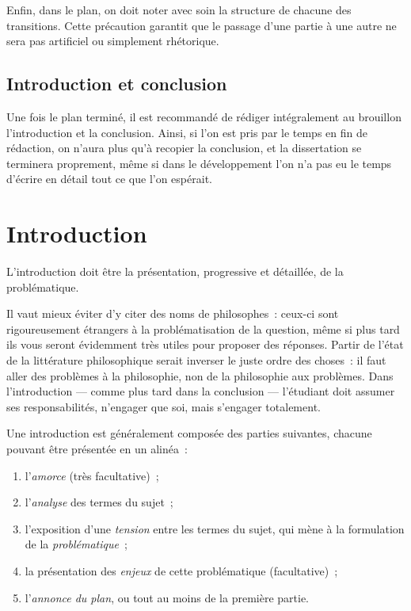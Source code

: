 \documentclass[a4paper,11pt]{article}
\begin{document}
\par

Enfin, dans le plan, on doit noter avec soin la structure de chacune des
transitions. Cette précaution garantit que le passage d'une partie à une
autre ne sera pas artificiel ou simplement rhétorique.

\par

\subsection{Introduction et conclusion}

Une fois le plan terminé, il est recommandé de rédiger intégralement au
brouillon l'introduction et la conclusion. Ainsi, si l'on est pris par
le temps en fin de rédaction, on n'aura plus qu'à recopier la
conclusion, et la dissertation se terminera proprement, même si dans le
développement l'on n'a pas eu le temps d'écrire en détail tout ce que
l'on espérait.




\section{Introduction}

L'introduction doit être la présentation, progressive et détaillée, de
la problématique.

\par

Il vaut mieux éviter d'y citer des noms de philosophes~: ceux-ci sont
rigoureusement étrangers à la problématisation de la question, même si
plus tard ils vous seront évidemment très utiles pour proposer des
réponses. Partir de l'état de la littérature philosophique serait
inverser le juste ordre des choses~: il faut aller des problèmes à la
philosophie, non de la philosophie aux problèmes. Dans l'introduction
--- comme plus tard dans la conclusion --- l'étudiant doit assumer ses
responsabilités, n'engager que soi, mais s'engager totalement.

\par

Une introduction est généralement composée des parties suivantes,
chacune pouvant être présentée en un alinéa~:
\begin{enumerate}
\item l'\emph{amorce} (très facultative)~;
\item l'\emph{analyse} des termes du sujet~;
\item l'exposition d'une \emph{tension} entre les termes du sujet, qui
  mène à la formulation de la \emph{problématique}~;
\item la présentation des \emph{enjeux} de cette problématique
  (facultative)~;
\item l'\emph{annonce du plan}, ou tout au moins de la première partie.
\end{enumerate}
\end{document}
